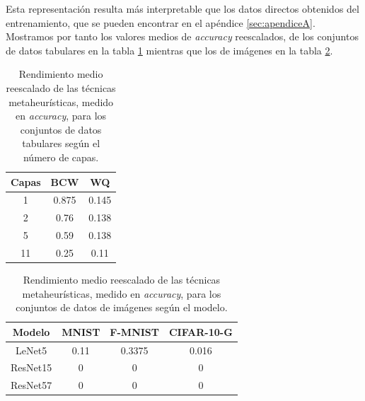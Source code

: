 Esta representación resulta más interpretable que los datos directos obtenidos del entrenamiento, que se pueden encontrar en el apéndice \ref{sec:apendiceA}. Mostramos por tanto los valores medios de \textit{accuracy} reescalados, de los conjuntos de datos tabulares en la tabla \ref{tab:p1tab} mientras que los de imágenes en la tabla \ref{tab:p1im}.

\begin{table}[]
\centering
\begin{tabular}{|c|c|c|}
\hline
\textbf{Capas} & \textbf{BCW} & \textbf{WQ} \\ \hline
1     & 0.875        & 0.145       \\ \hline
2     & 0.76         & 0.138       \\ \hline
5     & 0.59         & 0.138       \\ \hline
11    & 0.25         & 0.11        \\ \hline
\end{tabular}
\caption{Rendimiento medio reescalado de las técnicas metaheurísticas, medido en \textit{accuracy}, para los conjuntos de datos tabulares según el número de capas.}
\label{tab:p1tab}
\end{table}

\begin{table}[]
\centering
\begin{tabular}{|c|c|c|c|}
\hline
\textbf{Modelo}    & \textbf{MNIST} & \textbf{F-MNIST} & \textbf{CIFAR-10-G} \\ \hline
LeNet5   & 0.11           & 0.3375           & 0.016             \\ \hline
ResNet15 & 0              & 0                & 0                 \\ \hline
ResNet57 & 0              & 0                & 0                 \\ \hline
\end{tabular}
\caption{Rendimiento medio reescalado de las técnicas metaheurísticas, medido en \textit{accuracy}, para los conjuntos de datos de imágenes según el modelo.}
\label{tab:p1im}
\end{table}

